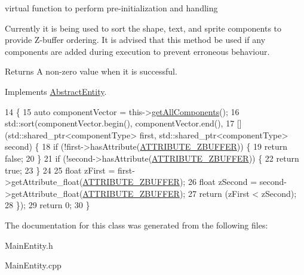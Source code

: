 virtual function to perform pre-\/initialization and handling 

Currently it is being used to sort the shape, text, and sprite components to provide Z-\/buffer ordering. It is advised that this method be used if any components are added during execution to prevent erroneous behaviour.

\begin{DoxyReturn}{Returns}
A non-\/zero value when it is successful. 
\end{DoxyReturn}


Implements \hyperlink{class_abstract_entity_af14b173190f84093b5498d3c0139e71f}{Abstract\-Entity}.


\begin{DoxyCode}
14                        \{
15     \textcolor{keyword}{auto} componentVector = this->\hyperlink{class_abstract_entity_af67659713b7d451168d53206c1d71de7}{getAllComponents}();
16     std::sort(componentVector.begin(), componentVector.end(),
17         [] (std::shared\_ptr<componentType> first, std::shared\_ptr<componentType> second) \{
18             \textcolor{keywordflow}{if} (!first->hasAttribute(\hyperlink{_a_e___attributes_8h_af11539bb711833d6321aaccd369e9e4b}{ATTRIBUTE\_ZBUFFER})) \{
19                 \textcolor{keywordflow}{return} \textcolor{keyword}{false};
20             \}
21             \textcolor{keywordflow}{if} (!second->hasAttribute(\hyperlink{_a_e___attributes_8h_af11539bb711833d6321aaccd369e9e4b}{ATTRIBUTE\_ZBUFFER})) \{
22                 \textcolor{keywordflow}{return} \textcolor{keyword}{true};
23             \}
24 
25             \textcolor{keywordtype}{float} zFirst = first->getAttribute\_float(\hyperlink{_a_e___attributes_8h_af11539bb711833d6321aaccd369e9e4b}{ATTRIBUTE\_ZBUFFER});
26             \textcolor{keywordtype}{float} zSecond = second->getAttribute\_float(\hyperlink{_a_e___attributes_8h_af11539bb711833d6321aaccd369e9e4b}{ATTRIBUTE\_ZBUFFER});
27             \textcolor{keywordflow}{return} (zFirst < zSecond);
28     \});
29     \textcolor{keywordflow}{return} 0;
30 \}\end{DoxyCode}


The documentation for this class was generated from the following files\-:\begin{DoxyCompactItemize}
\item 
Main\-Entity.\-h\item 
Main\-Entity.\-cpp\end{DoxyCompactItemize}
